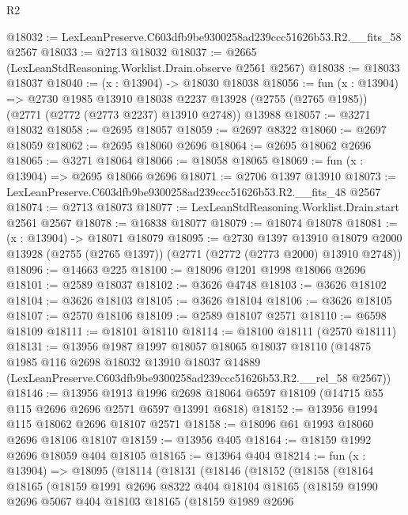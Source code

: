 \begin{lexlean}{R2}
\begin{coremodule}
@18032 := LexLeanPreserve.C603dfb9be9300258ad239ccc51626b53.R2.__fits_58 @2567
@18033 := @2713 @18032
@18037 := @2665 (LexLeanStdReasoning.Worklist.Drain.observe @2561 @2567)
@18038 := @18033 @18037
@18040 := (x : @13904) -> @18030 @18038
@18056 := fun (x : @13904) =>
  @2730
    @1985
    @13910
    @18038
    @2237
    @13928
    (@2755 (@2765 @1985))
    (@2771 (@2772 (@2773 @2237) @13910 @2748))
    @13988
@18057 := @3271 @18032
@18058 := @2695 @18057
@18059 := @2697 @8322
@18060 := @2697 @18059
@18062 := @2695 @18060 @2696
@18064 := @2695 @18062 @2696
@18065 := @3271 @18064
@18066 := @18058 @18065
@18069 := fun (x : @13904) => @2695 @18066 @2696
@18071 := @2706 @1397 @13910
@18073 := LexLeanPreserve.C603dfb9be9300258ad239ccc51626b53.R2.__fits_48 @2567
@18074 := @2713 @18073
@18077 := LexLeanStdReasoning.Worklist.Drain.start @2561 @2567
@18078 := @16838 @18077
@18079 := @18074 @18078
@18081 := (x : @13904) -> @18071 @18079
@18095 := @2730
    @1397
    @13910
    @18079
    @2000
    @13928
    (@2755 (@2765 @1397))
    (@2771 (@2772 (@2773 @2000) @13910 @2748))
@18096 := @14663 @225
@18100 := @18096 @1201 @1998 @18066 @2696
@18101 := @2589 @18037
@18102 := @3626 @4748
@18103 := @3626 @18102
@18104 := @3626 @18103
@18105 := @3626 @18104
@18106 := @3626 @18105
@18107 := @2570 @18106
@18109 := @2589 @18107 @2571
@18110 := @6598 @18109
@18111 := @18101 @18110
@18114 := @18100 @18111 (@2570 @18111)
@18131 := @13956
    @1987
    @1997
    @18057
    @18065
    @18037
    @18110
    (@14875
      @1985
      @116
      @2698
      @18032
      @13910
      @18037
      @14889
      (LexLeanPreserve.C603dfb9be9300258ad239ccc51626b53.R2.__rel_58 @2567))
@18146 := @13956
    @1913
    @1996
    @2698
    @18064
    @6597
    @18109
    (@14715 @55 @115 @2696 @2696 @2571 @6597 @13991 @6818)
@18152 := @13956 @1994 @115 @18062 @2696 @18107 @2571
@18158 := @18096 @61 @1993 @18060 @2696 @18106 @18107
@18159 := @13956 @405
@18164 := @18159 @1992 @2696 @18059 @404 @18105
@18165 := @13964 @404
@18214 := fun (x : @13904) =>
  @18095
    (@18114
      (@18131
        (@18146
          (@18152
            (@18158
              (@18164
                @18165
                (@18159
                  @1991
                  @2696
                  @8322
                  @404
                  @18104
                  @18165
                  (@18159
                    @1990
                    @2696
                    @5067
                    @404
                    @18103
                    @18165
                    (@18159
                      @1989
                      @2696

\end{coremodule}
\end{lexlean}
